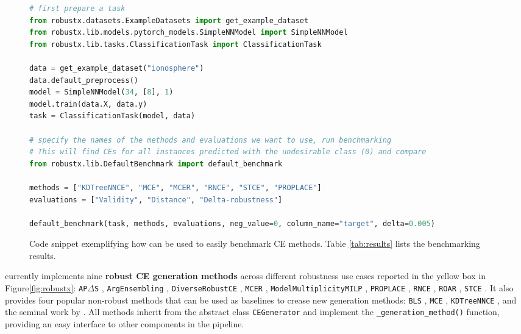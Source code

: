 \begin{figure*}[t!]
    \centering
    \begin{lstlisting}[language=Python]
# first prepare a task
from robustx.datasets.ExampleDatasets import get_example_dataset
from robustx.lib.models.pytorch_models.SimpleNNModel import SimpleNNModel
from robustx.lib.tasks.ClassificationTask import ClassificationTask

data = get_example_dataset("ionosphere")
data.default_preprocess()
model = SimpleNNModel(34, [8], 1)
model.train(data.X, data.y)
task = ClassificationTask(model, data)

# specify the names of the methods and evaluations we want to use, run benchmarking
# This will find CEs for all instances predicted with the undesirable class (0) and compare
from robustx.lib.DefaultBenchmark import default_benchmark

methods = ["KDTreeNNCE", "MCE", "MCER", "RNCE", "STCE", "PROPLACE"]
evaluations = ["Validity", "Distance", "Delta-robustness"]

default_benchmark(task, methods, evaluations, neg_value=0, column_name="target", delta=0.005)
\end{lstlisting}
    \caption{Code snippet exemplifying how \name{} can be used to easily benchmark CE methods. Table \ref{tab:results} lists the benchmarking results.
    }
    \label{fig:example}
\end{figure*}

\name{} currently implements nine \textbf{robust CE generation methods} across different robustness use cases reported in the yellow box in Figure\;\ref{fig:robustx}: \texttt{AP$\Delta$S} \cite{DBLP:conf/ecai/MarzariLCF24}, \texttt{ArgEnsembling} \cite{DBLP:conf/aamas/JiangL0T24}, \texttt{DiverseRobustCE} \cite{LeofanteP24}, \texttt{MCER} \cite{JiangL0T23}, \texttt{ModelMultiplicityMILP} \cite{DBLP:conf/kr/LeofanteBR23}, \texttt{PROPLACE} \cite{DBLP:conf/acml/JiangLL0T23}, \texttt{RNCE} \cite{JiangLRT24}, \texttt{ROAR} \cite{UpadhyayJL21}, \texttt{STCE} \cite{DBLP:conf/icml/DuttaLMTM22,DBLP:conf/icml/HammanNMMD23}. It also provides four popular non-robust methods that can be used as baselines to crease new generation methods: \texttt{BLS} \cite{LeofanteP24}, \texttt{MCE} \cite{MohammadiKBV21}, \texttt{KDTreeNNCE} \cite{DBLP:journals/datamine/BrughmansLM24}, and the seminal work by \cite{Wachter17}. All methods inherit from the abstract class \texttt{CEGenerator} and implement the  \texttt{\_generation\_method()} function, providing an easy interface to other components in the pipeline. 

